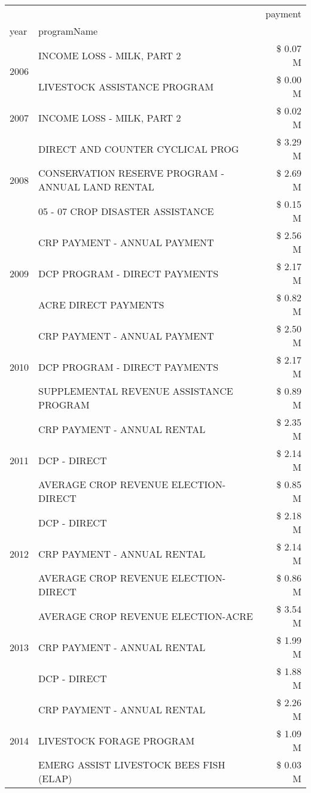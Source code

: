 \begin{tabular}{llr}
\toprule
 &  & payment \\
year & programName &  \\
\midrule
\multirow[t]{2}{*}{2006} & INCOME LOSS - MILK, PART 2 & \$ 0.07 M \\
 & LIVESTOCK ASSISTANCE PROGRAM & \$ 0.00 M \\
\cline{1-3}
2007 & INCOME LOSS - MILK, PART 2 & \$ 0.02 M \\
\cline{1-3}
\multirow[t]{3}{*}{2008} & DIRECT AND COUNTER CYCLICAL PROG & \$ 3.29 M \\
 & CONSERVATION RESERVE PROGRAM - ANNUAL LAND RENTAL & \$ 2.69 M \\
 & 05 - 07 CROP DISASTER ASSISTANCE & \$ 0.15 M \\
\cline{1-3}
\multirow[t]{3}{*}{2009} & CRP PAYMENT - ANNUAL PAYMENT & \$ 2.56 M \\
 & DCP PROGRAM - DIRECT PAYMENTS & \$ 2.17 M \\
 & ACRE DIRECT PAYMENTS & \$ 0.82 M \\
\cline{1-3}
\multirow[t]{3}{*}{2010} & CRP PAYMENT - ANNUAL PAYMENT & \$ 2.50 M \\
 & DCP PROGRAM - DIRECT PAYMENTS & \$ 2.17 M \\
 & SUPPLEMENTAL REVENUE ASSISTANCE PROGRAM & \$ 0.89 M \\
\cline{1-3}
\multirow[t]{3}{*}{2011} & CRP PAYMENT - ANNUAL RENTAL & \$ 2.35 M \\
 & DCP - DIRECT & \$ 2.14 M \\
 & AVERAGE CROP REVENUE ELECTION-DIRECT & \$ 0.85 M \\
\cline{1-3}
\multirow[t]{3}{*}{2012} & DCP - DIRECT & \$ 2.18 M \\
 & CRP PAYMENT - ANNUAL RENTAL & \$ 2.14 M \\
 & AVERAGE CROP REVENUE ELECTION-DIRECT & \$ 0.86 M \\
\cline{1-3}
\multirow[t]{3}{*}{2013} & AVERAGE CROP REVENUE ELECTION-ACRE & \$ 3.54 M \\
 & CRP PAYMENT - ANNUAL RENTAL & \$ 1.99 M \\
 & DCP - DIRECT & \$ 1.88 M \\
\cline{1-3}
\multirow[t]{3}{*}{2014} & CRP PAYMENT - ANNUAL RENTAL & \$ 2.26 M \\
 & LIVESTOCK FORAGE PROGRAM & \$ 1.09 M \\
 & EMERG ASSIST LIVESTOCK BEES FISH (ELAP) & \$ 0.03 M \\
\cline{1-3}

\end{tabular}
